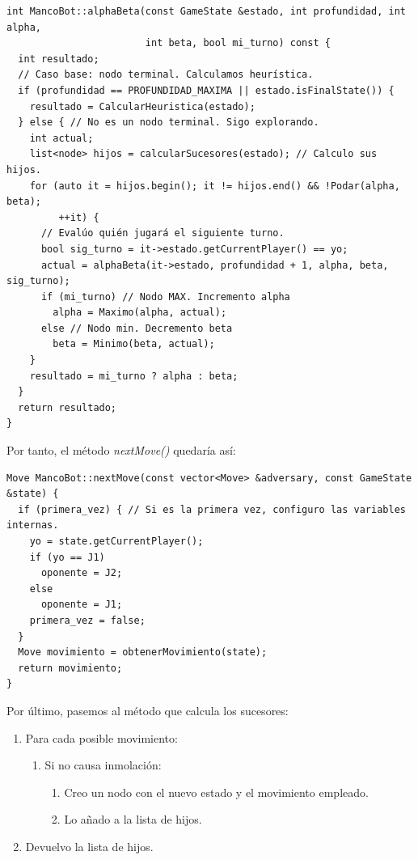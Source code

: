 \documentclass[12pt,spanish]{article}
\begin{document}
\begin{verbatim}
int MancoBot::alphaBeta(const GameState &estado, int profundidad, int alpha,
                        int beta, bool mi_turno) const {
  int resultado;
  // Caso base: nodo terminal. Calculamos heurística.
  if (profundidad == PROFUNDIDAD_MAXIMA || estado.isFinalState()) {
    resultado = CalcularHeuristica(estado);
  } else { // No es un nodo terminal. Sigo explorando.
    int actual;
    list<node> hijos = calcularSucesores(estado); // Calculo sus hijos.
    for (auto it = hijos.begin(); it != hijos.end() && !Podar(alpha, beta);
         ++it) {
      // Evalúo quién jugará el siguiente turno.
      bool sig_turno = it->estado.getCurrentPlayer() == yo;
      actual = alphaBeta(it->estado, profundidad + 1, alpha, beta, sig_turno);
      if (mi_turno) // Nodo MAX. Incremento alpha
        alpha = Maximo(alpha, actual);
      else // Nodo min. Decremento beta
        beta = Minimo(beta, actual);
    }
    resultado = mi_turno ? alpha : beta;
  }
  return resultado;
}
\end{verbatim}



\newpage
Por tanto, el método \emph{nextMove()} quedaría así:

\begin{verbatim}
Move MancoBot::nextMove(const vector<Move> &adversary, const GameState &state) {
  if (primera_vez) { // Si es la primera vez, configuro las variables internas.
    yo = state.getCurrentPlayer();
    if (yo == J1)
      oponente = J2;
    else
      oponente = J1;
    primera_vez = false;
  }
  Move movimiento = obtenerMovimiento(state);
  return movimiento;
}
\end{verbatim}



Por último, pasemos al método que calcula los sucesores:

\begin{enumerate}
	\item Para cada posible movimiento:
		\begin{enumerate}[label=1.\arabic*]
			\item Si no causa inmolación:
				\begin{enumerate}[label=1.1.\arabic*]
					\item Creo un nodo con el nuevo estado y el movimiento empleado.
					\item Lo añado a la lista de hijos.	
				\end{enumerate}
		\end{enumerate}
		\item Devuelvo la lista de hijos.
\end{enumerate}
\end{document}
